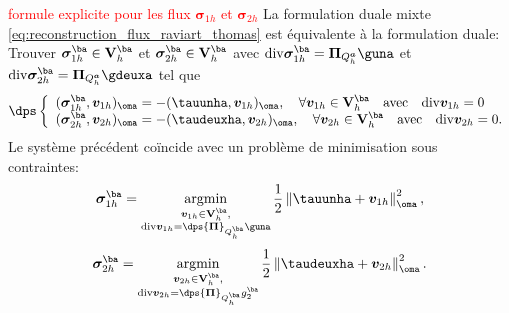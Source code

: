 \documentclass{beamer}
\DeclareMathOperator*{\argmin}{argmin}
\renewcommand{\div}{\mathrm{div}}
\begin{document}
\begin{frame}
\textcolor{red}{formule explicite pour les flux ${\bm \sigma}_{1h}$ et ${\bm \sigma}_{2h}$}
La formulation duale mixte   \eqref{eq:reconstruction_flux_raviart_thomas}
est équivalente à la formulation duale:
Trouver ${\bm{\sigma}}_{1h}^{\ba} \in {\bf V}_h^{\ba}$ et ${\bm{\sigma}}_{2h}^{\ba} \in {\bf V}_h^{\ba}$ avec $\div {\bm{\sigma}}_{1h}^{\ba}={\bm \Pi}_{Q_h^{\bm a}}\guna$ et $\div {\bm{\sigma}}_{2h}^{\ba}={\bm \Pi}_{Q_h^{\bm a}} \gdeuxa$ tel que
\begin{equation}
\dps
\left\lbrace\begin{array}{ll}
({\bm{\sigma}}_{1h}^{\ba},{\bm v}_{1h})_{\oma}=-(\tauunha,{\bm v}_{1h})_{\oma}, \quad \forall {\bm v}_{1h} \in  {\bf V}_h^{\ba} \quad \mbox{avec} \quad \div {\bm v}_{1h}=0
\\
({\bm{\sigma}}_{2h}^{\ba},{\bm v}_{2h})_{\oma}=-(\taudeuxha,{\bm v}_{2h})_{\oma}, \quad \forall {\bm v}_{2h} \in  {\bf V}_h^{\ba} \quad \mbox{avec} \quad \div {\bm v}_{2h}=0.
\label{eq: system_dual_2}
\end{array}
\right.
\end{equation}
Le système précédent coïncide avec un problème de minimisation sous contraintes:
\begin{equation}
{\bm{\sigma}}_{1h}^{\ba}=\argmin\limits_{\substack{{\bm v}_{1h} \in {\bf V}_h^{\ba},\\ \div {\bm v}_{1h}= 
{\dps {\bm \Pi}}_{Q_h^{\ba}}\guna}} \frac{1}{2}\left\|\tauunha+{\bm v}_{1h}\right\|^2_{\oma}, 
\label{eq: minimisation_system_dual_1}
\end{equation}
\begin{equation}
{\bm{\sigma}}_{2h}^{\ba}=\argmin\limits_{\substack{{\bm v}_{2h} \in {\bf V}_h^{\ba},\\ \div {\bm v}_{2h}= 
{\dps {\bm \Pi}}_{Q_h^{\ba}}g_{\mathrm{2}}^{\ba}}}  \frac{1}{2}\left\|\taudeuxha+{\bm v}_{2h}\right\|^2_{\oma}. 
\label{eq: minimisation_system_dual_2}
\end{equation}
\end{frame}
\end{document}

